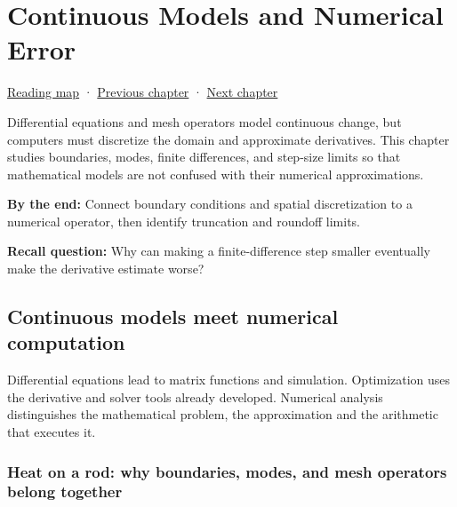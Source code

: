 \chapter{Continuous Models and Numerical Error}\label{02-foundations-ii-ch025-continuous-models-and-numerical-error}\hypertarget{02-foundations-ii-ch025}{}\label{stagechapter:02-foundations-ii-ch025}

\hypertarget{02-foundations-ii-ch025-continuous-models-and-numerical-error}{}

\hyperref[volume-reading-map]{Reading map} · \hyperref[02-foundations-ii-ch024-waiting-times-covariance-and-matrix-decomposition]{Previous chapter} · \hyperref[02-foundations-ii-ch026-matrix-functions-and-nonlinear-least-squares]{Next chapter}

Differential equations and mesh operators model continuous change, but computers must discretize the domain and approximate derivatives. This chapter studies boundaries, modes, finite differences, and step-size limits so that mathematical models are not confused with their numerical approximations.

\textbf{By the end:} Connect boundary conditions and spatial discretization to a numerical operator, then identify truncation and roundoff limits.

\textbf{Recall question:} Why can making a finite-difference step smaller eventually make the derivative estimate worse?

\section{Continuous models meet numerical computation}\label{02-foundations-ii-ch025-continuous-models-meet-numerical-computation}

\hypertarget{02-foundations-ii-ch025-continuous-models-meet-numerical-computation}{}

Differential equations lead to matrix functions and simulation. Optimization uses the derivative and solver tools already developed. Numerical analysis distinguishes the mathematical problem, the approximation and the arithmetic that executes it.

\subsection{Heat on a rod: why boundaries, modes, and mesh operators belong together}\label{02-foundations-ii-ch025-heat-on-a-rod-why-boundaries-modes-and-mesh-operators-belong-together}

